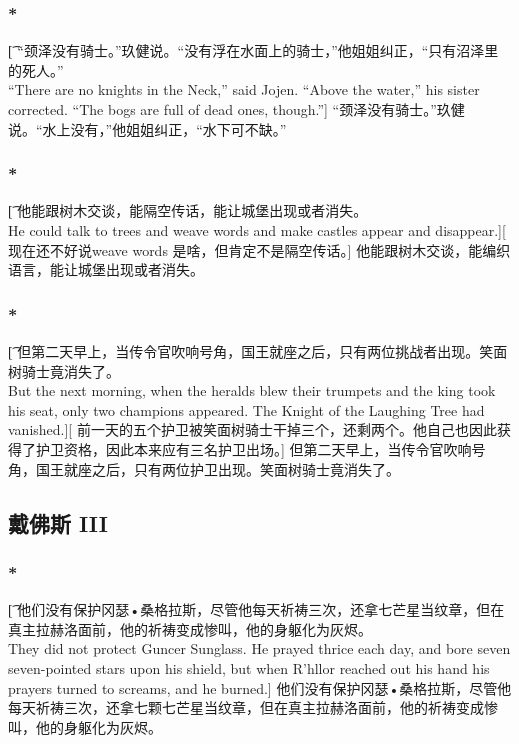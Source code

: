 \documentclass[12pt,a4paper]{article}
\begin{document}
\subsubsection{\color{red}*}\t[
	“颈泽没有骑士。”玖健说。“没有浮在水面上的骑士，”他姐姐纠正，“只有沼泽里的死人。”\\
	“There are no knights in the Neck,” said Jojen. “Above the water,” his sister corrected. “The bogs are full of dead ones, though.”]
	“颈泽没有骑士。”玖健说。“水上没有，”他姐姐纠正，“水下可不缺。”
	
\subsubsection{\color{red}*}\t[
	他能跟树木交谈，能隔空传话，能让城堡出现或者消失。\\
	He could talk to trees and weave words and make castles appear and disappear.][
	现在还不好说weave words 是啥，但肯定不是隔空传话。]
	他能跟树木交谈，能编织语言，能让城堡出现或者消失。
	
\subsubsection{\color{red}*}\t[
	但第二天早上，当传令官吹响号角，国王就座之后，只有两位挑战者出现。笑面树骑士竟消失了。\\
	But the next morning, when the heralds blew their trumpets and the king took his seat, only two champions appeared. The Knight of the Laughing Tree had vanished.][
	前一天的五个护卫被笑面树骑士干掉三个，还剩两个。他自己也因此获得了护卫资格，因此本来应有三名护卫出场。]
	但第二天早上，当传令官吹响号角，国王就座之后，只有两位护卫出现。笑面树骑士竟消失了。
	
\subsection{戴佛斯 III}
\subsubsection{\color{red}*}\t[
	他们没有保护冈瑟•桑格拉斯，尽管他每天祈祷三次，还拿七芒星当纹章，但在真主拉赫洛面前，他的祈祷变成惨叫，他的身躯化为灰烬。\\
	They did not protect Guncer Sunglass. He prayed thrice each day, and bore seven seven-pointed stars upon his shield, but when R'hllor reached out his hand his prayers turned to screams, and he burned.]
	他们没有保护冈瑟•桑格拉斯，尽管他每天祈祷三次，还拿七颗七芒星当纹章，但在真主拉赫洛面前，他的祈祷变成惨叫，他的身躯化为灰烬。
	
\end{document}
